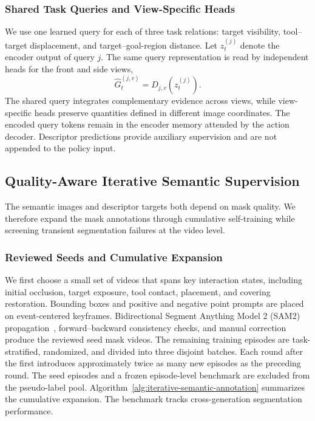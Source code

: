 \subsubsection{Shared Task Queries and View-Specific Heads}
We use one learned query for each of three task relations: target visibility, tool--target displacement, and target--goal-region distance.
Let $z_t^{(j)}$ denote the encoder output of query $j$.
The same query representation is read by independent heads for the front and side views,
\begin{equation}
 \widehat G_t^{(j,v)}=D_{j,v}\!\left(z_t^{(j)}\right).
 \label{eq:viewqueryheads}
\end{equation}
The shared query integrates complementary evidence across views, while view-specific heads preserve quantities defined in different image coordinates.
The encoded query tokens remain in the encoder memory attended by the action decoder.
Descriptor predictions provide auxiliary supervision and are not appended to the policy input.

\subsection{Quality-Aware Iterative Semantic Supervision}
\label{sec:methodseg}
The semantic images and descriptor targets both depend on mask quality.
We therefore expand the mask annotations through cumulative self-training while screening transient segmentation failures at the video level.

\subsubsection{Reviewed Seeds and Cumulative Expansion}
We first choose a small set of videos that spans key interaction states, including initial occlusion, target exposure, tool contact, placement, and covering restoration.
Bounding boxes and positive and negative point prompts are placed on event-centered keyframes.
Bidirectional Segment Anything Model 2 (SAM2) propagation~\cite{ravi2024sam2}, forward--backward consistency checks, and manual correction produce the reviewed seed mask videos.
The remaining training episodes are task-stratified, randomized, and divided into three disjoint batches.
Each round after the first introduces approximately twice as many new episodes as the preceding round.
The seed episodes and a frozen episode-level benchmark are excluded from the pseudo-label pool.
Algorithm~\ref{alg:iterative-semantic-annotation} summarizes the cumulative expansion.
The benchmark tracks cross-generation segmentation performance.

